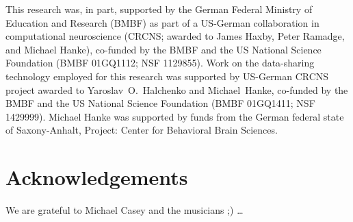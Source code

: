 This research was, in part, supported by the German Federal Ministry of
Education and Research (BMBF) as part of a US-German collaboration in
computational neuroscience (CRCNS; awarded to James Haxby, Peter Ramadge, and
Michael Hanke), co-funded by the BMBF and the US National Science Foundation
(BMBF 01GQ1112; NSF 1129855).  Work on the data-sharing technology employed for
this research was supported by US-German CRCNS project awarded to
Yaroslav~O.~Halchenko and Michael~Hanke, co-funded by the BMBF and the US
National Science Foundation (BMBF 01GQ1411; NSF 1429999).  Michael Hanke was
supported by funds from the German federal state of Saxony-Anhalt, Project:
Center for Behavioral Brain Sciences.


\section*{Acknowledgements}

We are grateful to Michael Casey and the musicians ;) \ldots





